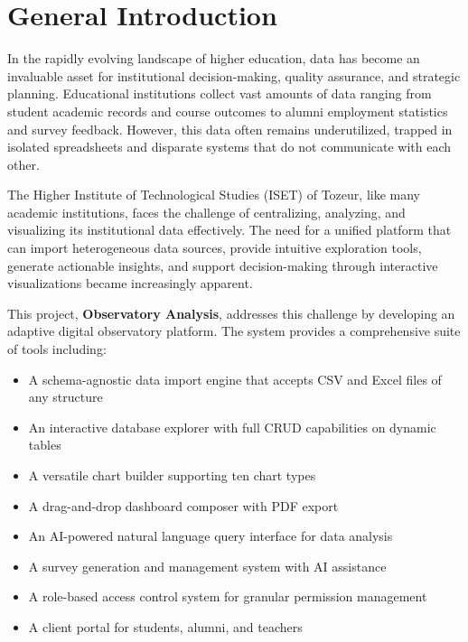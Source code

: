 \documentclass[12pt,a4paper]{report}
\begin{document}
\chapter*{General Introduction}

In the rapidly evolving landscape of higher education, data has become an invaluable asset for institutional decision-making, quality assurance, and strategic planning. Educational institutions collect vast amounts of data ranging from student academic records and course outcomes to alumni employment statistics and survey feedback. However, this data often remains underutilized, trapped in isolated spreadsheets and disparate systems that do not communicate with each other.

The Higher Institute of Technological Studies (ISET) of Tozeur, like many academic institutions, faces the challenge of centralizing, analyzing, and visualizing its institutional data effectively. The need for a unified platform that can import heterogeneous data sources, provide intuitive exploration tools, generate actionable insights, and support decision-making through interactive visualizations became increasingly apparent.

This project, \textbf{Observatory Analysis}, addresses this challenge by developing an adaptive digital observatory platform. The system provides a comprehensive suite of tools including:
\begin{itemize}
    \item A schema-agnostic data import engine that accepts CSV and Excel files of any structure
    \item An interactive database explorer with full CRUD capabilities on dynamic tables
    \item A versatile chart builder supporting ten chart types
    \item A drag-and-drop dashboard composer with PDF export
    \item An AI-powered natural language query interface for data analysis
    \item A survey generation and management system with AI assistance
    \item A role-based access control system for granular permission management
    \item A client portal for students, alumni, and teachers
\end{itemize}
\end{document}
